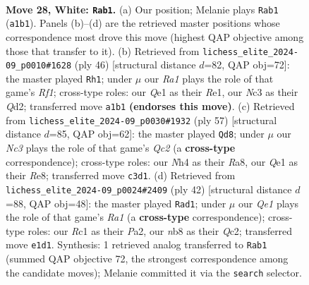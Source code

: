 \documentclass[11pt]{article}
\begin{document}
\clearpage

\begin{figure}[p]\centering
\begin{subfigure}{0.46\textwidth}\centering
\resizebox{\linewidth}{!}{%
\newchessgame
\chessboard[
  setfen={1n2r1k1/4q1p1/rp1ppn2/4p2p/P3P2N/2N3P1/2P2P1P/R1R1Q1K1 w - - 0 28},
  showmover=false,
  pgfstyle=straightmove, color=movearrow, markmove={a1-b1}
]}
\caption{}
\end{subfigure}\hfill
\begin{subfigure}{0.46\textwidth}\centering
\resizebox{\linewidth}{!}{%
\newchessgame
\chessboard[
  setfen={4rr2/ppp2q1k/3pn1pp/1P6/P1P1NP2/3P2P1/3Q2K1/4RR2 w - - 1 24},
  showmover=false,
  pgfstyle=straightmove, color=movearrow, markmove={f1-h1}
]}
\caption{}
\end{subfigure}
\\[4pt]
\begin{subfigure}{0.46\textwidth}\centering
\resizebox{\linewidth}{!}{%
\newchessgame
\chessboard[
  setfen={r3r1k1/2qn1pbp/6p1/p1pPp3/P3P3/NPR1Q1P1/3N3P/2R3K1 b - - 0 29},
  showmover=false,
  pgfstyle=straightmove, color=movearrow, markmove={c7-d8}
]}
\caption{}
\end{subfigure}\hfill
\begin{subfigure}{0.46\textwidth}\centering
\resizebox{\linewidth}{!}{%
\newchessgame
\chessboard[
  setfen={3r2k1/1pq2pp1/p2r1n1p/2pp4/8/2PRPN1P/PPQ2PP1/R5K1 w - - 8 22},
  showmover=false,
  pgfstyle=straightmove, color=movearrow, markmove={a1-d1}
]}
\caption{}
\end{subfigure}
\caption{\textbf{Move 28, White: \texttt{Rab1}.} (a) Our position; Melanie plays \texttt{Rab1} (\texttt{a1b1}). Panels (b)--(d) are the retrieved master positions whose correspondence most drove this move (highest QAP objective among those that transfer to it). (b) Retrieved from \texttt{lichess\_elite\_2024-09\_p0010\#1628} (ply 46) [structural distance $d$=82, QAP obj=72]: the master played \texttt{Rh1}; under $\mu$ our \emph{Ra1} plays the role of that game's \emph{Rf1}; cross-type roles: our \emph{Q}e1 as their \emph{R}e1, our \emph{N}c3 as their \emph{Q}d2; transferred move \texttt{a1b1} \textbf{(endorses this move)}. (c) Retrieved from \texttt{lichess\_elite\_2024-09\_p0030\#1932} (ply 57) [structural distance $d$=85, QAP obj=62]: the master played \texttt{Qd8}; under $\mu$ our \emph{Nc3} plays the role of that game's \emph{Qc2} (a \textbf{cross-type} correspondence); cross-type roles: our \emph{N}h4 as their \emph{R}a8, our \emph{Q}e1 as their \emph{R}e8; transferred move \texttt{c3d1}. (d) Retrieved from \texttt{lichess\_elite\_2024-09\_p0024\#2409} (ply 42) [structural distance $d$=88, QAP obj=48]: the master played \texttt{Rad1}; under $\mu$ our \emph{Qe1} plays the role of that game's \emph{Ra1} (a \textbf{cross-type} correspondence); cross-type roles: our \emph{R}c1 as their \emph{P}a2, our \emph{n}b8 as their \emph{Q}c2; transferred move \texttt{e1d1}. Synthesis: 1 retrieved analog transferred to \texttt{Rab1} (summed QAP objective 72, the strongest correspondence among the candidate moves); Melanie committed it via the \texttt{search} selector.}
\label{fig:thought-m54}
\end{figure}
\end{document}
